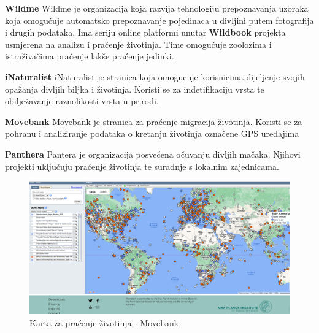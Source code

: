 		\begin{packed_item}
		
			\item \textbf{Wildme}\linebreak
			Wildme je organizacija koja razvija tehnologiju prepoznavanja uzoraka koja omogućuje automatsko prepoznavanje pojedinaca u divljini putem fotografija i drugih podataka. Ima seriju online platformi unutar \textbf{Wildbook} projekta usmjerena na analizu i praćenje životinja. Time omogućuje zoolozima i istraživačima praćenje lakše praćenje jedinki.
\vspace{12pt}
			
			\item \textbf{iNaturalist}\linebreak
			iNaturalist je stranica koja omogucuje korisnicima dijeljenje svojih opažanja divljih biljka i životinja. Koristi se za indetifikaciju vrsta te obilježavanje raznolikosti vrsta u prirodi.
\vspace{12pt}
			
			\item \textbf{Movebank}\linebreak
			Movebank je stranica za praćenje migracija životinja. Koristi se za pohranu i analiziranje podataka o kretanju životinja označene GPS uređajima
\vspace{12pt}
			
			\item \textbf{Panthera}\linebreak
			Pantera je organizacija posvećena očuvanju divljih mačaka. Njihovi projekti uključuju praćenje životinja te suradnje s lokalnim zajednicama.
			
		\end{packed_item}
		
        \begin{figure}[H]
			\includegraphics[scale=0.25]{slike/karta_movebank.PNG} %
			\centering
			\caption{Karta za praćenje životinja - Movebank}
			\label{fig:promjene}
		\end{figure}
		
